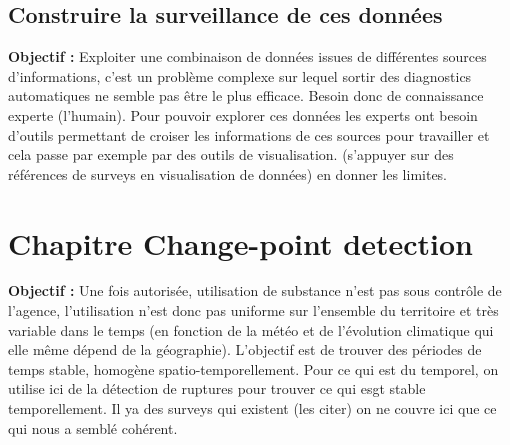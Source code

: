 \documentclass[12pt, twoside]{report}
\begin{document}

\section{Construire la surveillance de ces données}

\textbf{Objectif :} Exploiter une combinaison de données issues de différentes sources d'informations, c'est un problème complexe sur lequel sortir des diagnostics automatiques ne semble pas être le plus efficace. Besoin donc de connaissance experte (l'humain). Pour pouvoir explorer ces données les experts ont besoin d'outils permettant de croiser les informations de ces sources pour travailler et cela passe par exemple par des outils de visualisation. (s'appuyer sur des références de surveys en visualisation de données) en donner les limites. 



\chapter{Chapitre Change-point detection}

\textbf{Objectif :} Une fois autorisée, utilisation de substance n'est pas sous contrôle de l'agence, l'utilisation n'est donc pas uniforme sur l'ensemble du territoire et très variable dans le temps (en fonction de la météo et de l'évolution climatique qui elle même dépend de la géographie). L'objectif est de trouver des périodes de temps stable, homogène spatio-temporellement. Pour ce qui est du temporel, on utilise ici de la détection de ruptures pour trouver ce qui esgt stable temporellement. Il ya des surveys qui existent (les citer) on ne couvre ici que ce qui nous a semblé cohérent.
\end{document}
